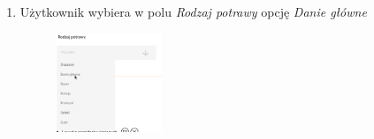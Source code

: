 \documentclass{article}
\begin{document}
\begin{enumerate}
\begin{figure}[H]
\begin{center}
            \end{center}
        \end{figure}
    \item Użytkownik wybiera w polu \textit{Rodzaj potrawy} opcję \textit{Danie główne}
        \begin{figure}[H]
            \begin{center}
                \includegraphics[width=0.3\textwidth]{images/add_recipe_step4}
            \end{center}
        \end{figure}
    \newpage


\end{enumerate}
\end{document}

